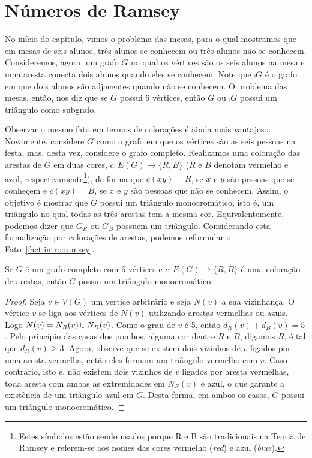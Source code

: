 
\section{Números de Ramsey}

No início do capítulo, vimos o problema das mesas, para o qual mostramos que em mesas de seis alunos, três alunos se conhecem ou três alunos não se conhecem. Consideremos, agora, um grafo $G$ no qual os vértices são os seis alunos na mesa e uma aresta conecta dois alunos quando eles se conhecem. Note que $\comp{G}$ é o grafo em que dois alunos são adjacentes quando não se conhecem. O problema das mesas, então, nos diz que se $G$ possui 6 vértices, então $G$ ou $\comp{G}$ possui um triângulo como subgrafo.

Observar o mesmo fato em termos de colorações é ainda mais vantajoso. Novamente, considere $G$ como o grafo em que os vértices são as seis pessoas na festa, mas, desta vez, considere o grafo completo. Realizamos uma coloração das arestas de $G$ em duas cores, $c: E(G) \to \{ R,B \}$ ($R$ e $B$ denotam vermelho e azul, respectivamente\footnote{Estes símbolos estão sendo usados porque R e B são tradicionais na Teoria de Ramsey e referem-se aos nomes das cores vermelho (\emph{red}) e azul (\emph{blue}).}), de forma que $c(xy) = R$, se $x$ e $y$ são pessoas que se conheçem e $c(xy) = B$, se $x$ e $y$ são pessoas que não se conhecem.
Assim, o objetivo é mostrar que $G$ possui um triângulo monocromático, isto é, um triângulo no qual todas as três arestas tem a mesma cor. Equivalentemente, podemos dizer que $G_R$ ou $G_B$ possuem um triângulo. Considerando esta formalização por colorações de arestas, podemos reformular o Fato~\ref{fact:intro:ramsey}.

\begin{proposition}
\label{thm:intro:r33}
Se $G$ é um grafo completo com 6 vértices e $c: E(G) \to \{ R,B\}$ é uma coloração de arestas, então $G$ possui um triângulo monocromático.
\end{proposition}
\begin{proof}
Seja $v \in V(G)$ um vértice arbitrário e seja $N(v)$ a sua vizinhança. O vértice $v$ se liga aos vértices de $N(v)$ utilizando arestas vermelhas ou azuis. Logo $N(v) = N_R(v) \operatorname{\cup} N_B(v)$. Como o grau de $v$ é 5, então $d_R(v) + d_B(v) = 5$. Pelo princípio das casas dos pombos, alguma cor dentre $R$ e $B$, digamos $R$, é tal que $d_R(v) \geq 3$. Agora, observe que se existem dois vizinhos de $v$ ligados por uma aresta vermelha, então eles formam um triângulo vermelho com $v$. Caso contrário, isto é, não existem dois vizinhos de $v$ ligados por aresta vermelhas, toda aresta com ambas as extremidades em $N_R(v)$ é azul, o que garante a existência de um triângulo azul em $G$. Desta forma, em ambos os casos, $G$ possui um triângulo monocromático.
\end{proof}

